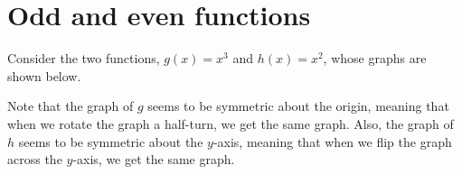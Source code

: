 \documentclass[nooutcomes]{ximera}
\begin{document}
%
%
%
%
%
%
%
%
% 



\section{Odd and even functions}

Consider the two functions, $g(x) = x^3$ and $h(x) = x^2$, whose graphs are shown below.
\begin{image}

\end{image}

Note that the graph of $g$ seems to be symmetric about the origin, meaning that when we rotate the graph a half-turn, we get the same graph. Also, the graph of $h$ seems to be symmetric about the $y$-axis, meaning that when we flip the graph across the $y$-axis, we get the same graph. 
\end{document}
